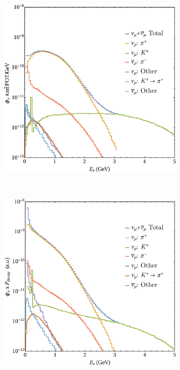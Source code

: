 \documentclass[11pt, a4paper]{article}
\begin{document}
\begin{figure}[t]
\center
\begin{subfigure}[t]{0.5\textwidth}
\includegraphics[width=\textwidth]{figures/microBooNE_flux.pdf} 
\end{subfigure}%
~
\begin{subfigure}[t]{0.5\textwidth}
\includegraphics[width=\textwidth]{figures/microBooNE_flux_weighted.pdf}
\end{subfigure}


\end{figure}
\end{document}
